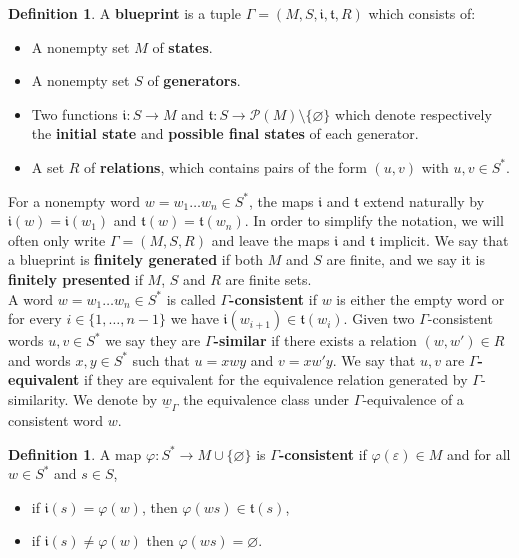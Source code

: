 \documentclass{article}
\theoremstyle{definition}
\newtheorem{defn}[theorem]{Definition} %
\theoremstyle{definition}
\newcommand{\init}{\mathfrak{i}}
\newcommand{\ter}{\mathfrak{t}}
\newcommand{\define}[1]{\textbf{#1}}
\begin{document}
\begin{defn}
\label{def:blueprint}
    A \define{blueprint} is a tuple $\Gamma = (M,S,\init,\ter,R)$ which consists of:
    \begin{itemize}
        \item A nonempty set $M$ of \define{states}.
        \item A nonempty set $S$ of \define{generators}.
        \item Two functions $\init\colon S\to M$ and $\ter\colon S\to\mathcal{P}(M)\setminus \{\varnothing\}$ which denote respectively the \define{initial state} and \define{possible final states} of each generator.
        \item A set $R$ of \define{relations}, which contains pairs of the form $(u,v)$ with $u,v\in S^*$.
    \end{itemize}
\end{defn}

For a nonempty word $w = w_1\dots w_n \in S^*$, the maps $\init$ and $\ter$ extend naturally by $\init(w) = \init(w_1)$ and $\ter(w) = \ter(w_n)$. In order to simplify the notation, we will often only write $\Gamma = (M,S,R)$ and leave the maps $\init$ and $\ter$ implicit. We say that a blueprint is \define{finitely generated} if both $M$ and $S$ are finite, and we say it is \define{finitely presented} if $M$, $S$ and $R$ are finite sets.\\


A word $w = w_1\dots w_n \in S^*$ is called \define{$\Gamma$-consistent} if $w$ is either the empty word or for every $i \in \{1,\dots, n-1\}$ we have $\init(w_{i+1}) \in \ter(w_i)$. Given two $\Gamma$-consistent words $u,v \in S^*$ we say they are \define{$\Gamma$-similar} if there exists a relation $(w,w') \in R$ and words $x,y \in S^*$ such that $u = xwy$ and $v = xw'y$. We say that $u,v$ are \define{$\Gamma$-equivalent} if they are equivalent for the equivalence relation generated by $\Gamma$-similarity. We denote by $\underline{w}_{\Gamma}$ the equivalence class under $\Gamma$-equivalence of a consistent word $w$.

\begin{defn}
\label{def:consistent}
    A map $\varphi\colon S^*\to M\cup\{\varnothing\}$ is \define{$\Gamma$-consistent} if $\varphi(\varepsilon)\in M$ and for all $w\in S^*$ and $s \in S$,
    \begin{itemize}
        \item if $\init(s) = \varphi(w)$, then $\varphi(ws)\in \ter(s)$,
        \item if $\init(s) \neq \varphi(w)$ then $\varphi(ws)= \varnothing$.
    \end{itemize}
\end{defn}
\end{document}
